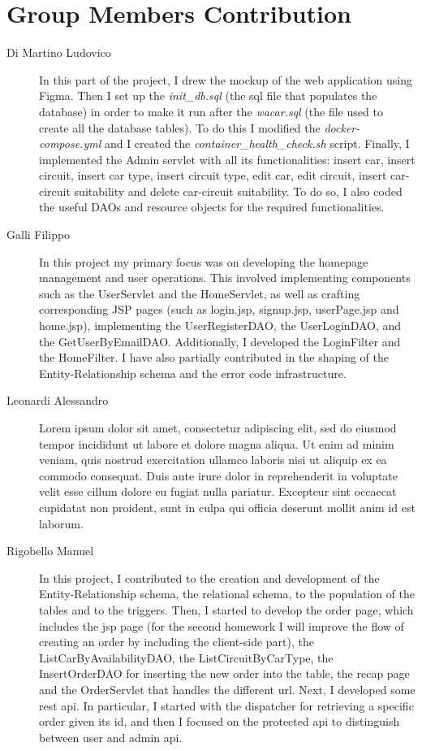 \section{Group Members Contribution}


\begin{description}
	\item[Di Martino Ludovico] In this part of the project, I drew the mockup of the web application using Figma. Then I set up the \textit{init\_db.sql} (the sql file that populates the database) in order to make it run after the \textit{wacar.sql} (the file used to create all the database tables). To do this I modified the \textit{docker-compose.yml} and I created the \textit{container\_health\_check.sh} script. Finally, I implemented the Admin servlet with all its functionalities: insert car, insert circuit, insert car type, insert circuit type, edit car, edit circuit, insert car-circuit suitability and delete car-circuit suitability. To do so, I also coded the useful DAOs and resource objects for the required functionalities.
	\item[Galli Filippo] In this project my primary focus was on developing the homepage management and user operations. This involved implementing components such as the UserServlet and the HomeServlet, as well as crafting corresponding JSP pages (such as login.jsp, signup.jsp, userPage.jsp and home.jsp), implementing the UserRegisterDAO, the UserLoginDAO, and the GetUserByEmailDAO. Additionally, I developed the LoginFilter and the HomeFilter. I have also partially contributed in the shaping of the Entity-Relationship schema and the error code infrastructure.
	\item[Leonardi Alessandro] Lorem ipsum dolor sit amet, consectetur adipiscing elit, sed do eiusmod tempor incididunt ut labore et dolore magna aliqua. Ut enim ad minim veniam, quis nostrud exercitation ullamco laboris nisi ut aliquip ex ea commodo consequat. Duis aute irure dolor in reprehenderit in voluptate velit esse cillum dolore eu fugiat nulla pariatur. Excepteur sint occaecat cupidatat non proident, sunt in culpa qui officia deserunt mollit anim id est laborum.
	\item[Rigobello Manuel] In this project, I contributed to the creation and development of the Entity-Relationship schema, the relational schema, to the population of the tables and to the triggers. Then, I started to develop the order page, which includes the jsp page (for the second homework I will improve the flow of creating an order by including the client-side part), the ListCarByAvailabilityDAO, the ListCircuitByCarType, the InsertOrderDAO for inserting the new order into the table, the recap page and the OrderServlet that handles the different url. Next, I developed some rest api. In particular, I started with the dispatcher for retrieving a specific order given its id, and then I focused on the protected api to distinguish between user and admin api.

\end{description}

